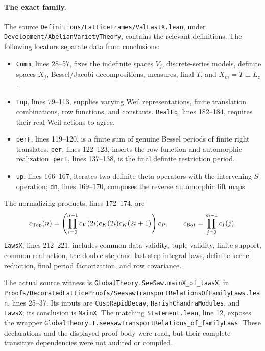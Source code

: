 \paragraph{The exact family.}
The source \texttt{Definitions/\allowbreak{}LatticeFrames/\allowbreak{}ValLastX.lean}, under
\texttt{Development/\allowbreak{}AbelianVarietyTheory}, contains the relevant definitions. The following locators separate data from conclusions:
\begin{itemize}
\item \texttt{Comm}, lines 28--57, fixes the indefinite spaces $V_j$, discrete-series models, definite spaces $X_j$, Bessel/Jacobi decompositions, measures, final $T$, and $X_m=T\perp L_z$.
\item \texttt{Tup}, lines 79--113, supplies varying Weil representations, finite translation combinations, row functions, and constants. \texttt{RealEq}, lines 182--184, requires their real Weil actions to agree.
\item \texttt{perF}, lines 119--120, is a finite sum of genuine Bessel periods of finite right translates. \texttt{per}, lines 122--123, inserts the row function and automorphic realization. \texttt{perT}, lines 137--138, is the final definite restriction period.
\item \texttt{up}, lines 166--167, iterates two definite theta operators with the intervening $S$ operation; \texttt{dn}, lines 169--170, composes the reverse automorphic lift maps.
\end{itemize}
The normalizing products, lines 172--174, are
\[
 c_{\rm Top}(n)=
 \left(\prod_{i=0}^{n-1}c_V(2i)c_K(2i)c_K(2i+1)\right)c_P,
 \qquad
 c_{\rm Bot}=\prod_{j=0}^{m-1}c_I(j).
\]
\texttt{LawsX}, lines 212--221, includes common-data validity, tuple validity, finite support, common real action, the double-step and last-step integral laws, definite kernel reduction, final period factorization, and row covariance.

The actual source witness is
\texttt{GlobalTheory.SeeSaw.mainX\_of\_lawsX}, in
\texttt{Proofs/\allowbreak{}DecoratedLatticeProofs/\allowbreak{}SeesawTransportRelationsOfFamilyLaws.lean}, lines 25--37. Its inputs are \texttt{CuspRapidDecay}, \texttt{HarishChandraModules}, and \texttt{LawsX}; its conclusion is \texttt{MainX}. The matching \texttt{Statement.lean}, line 12, exposes the wrapper
\texttt{GlobalTheory.T.seesawTransportRelations\_of\_familyLaws}.
These declarations and the displayed proof body were read, but their complete transitive dependencies were not audited or compiled.

